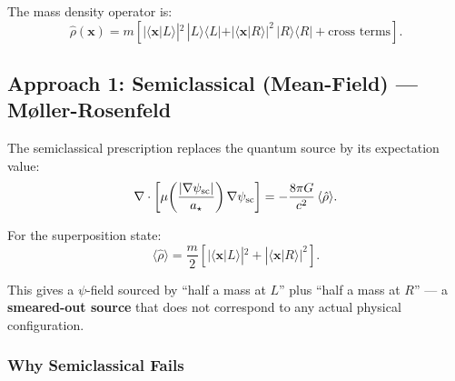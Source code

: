 \documentclass[11pt,a4paper]{article}
\begin{document}
The mass density operator is:
\begin{equation}
\hat{\rho}(\mathbf{x}) = m\left[
|\langle \mathbf{x}|L\rangle|^2\,|L\rangle\langle L|
+ |\langle \mathbf{x}|R\rangle|^2\,|R\rangle\langle R|
+ \text{cross terms}
\right].
\end{equation}

\subsection{Approach 1: Semiclassical (Mean-Field) --- M\o ller-Rosenfeld}
\label{sec:semiclassical}

The semiclassical prescription replaces the quantum source by its expectation value:
\begin{equation}\label{eq:semiclassical}
\nabla\cdot\left[\mu\!\left(\frac{|\nabla\psi_{\rm sc}|}{a_\star}\right)\nabla\psi_{\rm sc}\right]
= -\frac{8\pi G}{c^2}\,\langle\hat{\rho}\rangle.
\end{equation}

For the superposition state:
\begin{equation}
\langle\hat{\rho}\rangle = \frac{m}{2}\left[
|\langle \mathbf{x}|L\rangle|^2 + |\langle \mathbf{x}|R\rangle|^2
\right].
\end{equation}

This gives a $\psi$-field sourced by ``half a mass at $L$'' plus ``half a mass at $R$'' --- a \textbf{smeared-out source} that does not correspond to any actual physical configuration.

\subsubsection{Why Semiclassical Fails}
\end{document}
